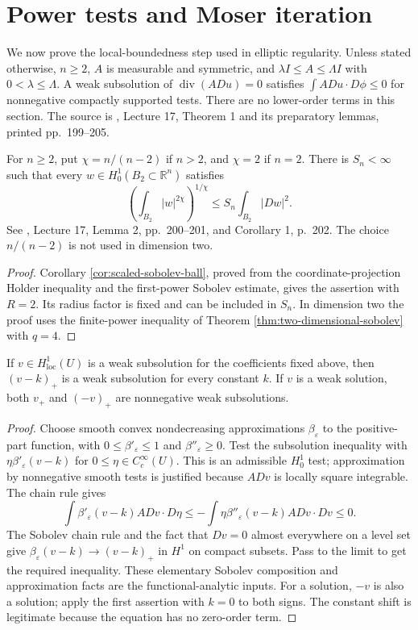 \chapter{Power tests and Moser iteration}\label{sec:moser-iteration}
We now prove the local-boundedness step used in elliptic regularity. Unless stated otherwise, $n\geq2$, $A$ is measurable and symmetric, and $\lambda I\leq A\leq\Lambda I$ with $0<\lambda\leq\Lambda$. A weak subsolution of $\operatorname{div}(A Du)=0$ satisfies $\int A Du\cdot D\phi\leq0$ for nonnegative compactly supported tests. There are no lower-order terms in this section. The source is \cite{SimonPDE}, Lecture 17, Theorem 1 and its preparatory lemmas, printed pp.~199--205.

\begin{theorem}\label{thm:iteration-sobolev-gain}
For $n\geq2$, put $\chi=n/(n-2)$ if $n>2$, and $\chi=2$ if $n=2$. There is $S_n<\infty$ such that every $w\in H_0^1(B_2\subset\mathbb R^n)$ satisfies
\[
 \left(\int_{B_2}|w|^{2\chi}\right)^{1/\chi}
 \leq S_n\int_{B_2}|Dw|^2.
\]
See \cite{SimonPDE}, Lecture 17, Lemma 2, pp.~200--201, and Corollary 1, p.~202. The choice $n/(n-2)$ is not used in dimension two.
\end{theorem}
\begin{proof}
Corollary \ref{cor:scaled-sobolev-ball}, proved from the coordinate-projection Holder inequality and the first-power Sobolev estimate, gives the assertion with $R=2$. Its radius factor is fixed and can be included in $S_n$. In dimension two the proof uses the finite-power inequality of Theorem \ref{thm:two-dimensional-sobolev} with $q=4$.
\end{proof}

\begin{lemma}\label{lem:positive-part-subsolution}
If $v\in H^1_{\mathrm{loc}}(U)$ is a weak subsolution for the coefficients fixed above, then $(v-k)_+$ is a weak subsolution for every constant $k$. If $v$ is a weak solution, both $v_+$ and $(-v)_+$ are nonnegative weak subsolutions.
\end{lemma}
\begin{proof}
Choose smooth convex nondecreasing approximations $\beta_\varepsilon$ to the positive-part function, with $0\leq\beta'_\varepsilon\leq1$ and $\beta''_\varepsilon\geq0$. Test the subsolution inequality with $\eta\beta'_\varepsilon(v-k)$ for $0\leq\eta\in C_c^\infty(U)$. This is an admissible $H_0^1$ test; approximation by nonnegative smooth tests is justified because $A Dv$ is locally square integrable. The chain rule gives
\[
 \int \beta'_\varepsilon(v-k)A Dv\cdot D\eta
 \leq-\int\eta\beta''_\varepsilon(v-k)A Dv\cdot Dv\leq0.
\]
The Sobolev chain rule and the fact that $Dv=0$ almost everywhere on a level set give $\beta_\varepsilon(v-k)\to(v-k)_+$ in $H^1$ on compact subsets. Pass to the limit to get the required inequality. These elementary Sobolev composition and approximation facts are the functional-analytic inputs. For a solution, $-v$ is also a solution; apply the first assertion with $k=0$ to both signs. The constant shift is legitimate because the equation has no zero-order term.
\end{proof}

